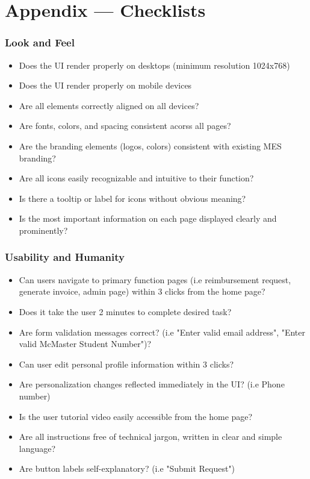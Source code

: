 \documentclass[12pt, titlepage]{article}
\begin{document}
\newpage{}
\section*{Appendix --- Checklists}


\hypertarget{checklist-nfr10}{}
\subsubsection{Look and Feel}

\begin{itemize}%
    \item Does the UI render properly on desktops (minimum resolution 1024x768) 
    \item Does the UI render properly on mobile devices 
    \item Are all elements correctly aligned on all devices? 
    \item Are fonts, colors, and spacing consistent acorss all pages?
    \item Are the branding elements (logos, colors) consistent with existing MES branding?
    \item Are all icons easily recognizable and intuitive to their function?
    \item Is there a tooltip or label for icons without obvious meaning?
    \item Is the most important information on each page displayed clearly and prominently?
\end{itemize}

\hypertarget{checklist-nfr11}{}
\subsubsection{Usability and Humanity}
  \begin{itemize} %
    \item Can users navigate to primary function pages (i.e reimbursement request, generate invoice, admin page) within 3 clicks from the home page?
    \item Does it take the user 2 minutes to complete desired task?
    \item Are form validation messages correct? (i.e "Enter valid email address", "Enter valid McMaster Student Number")?
    \item Can user edit personal profile information within 3 clicks?
    \item Are personalization changes reflected immediately in the UI? (i.e Phone number)
    \item Is the user tutorial video easily accessible from the home page?
    \item Are all instructions free of technical jargon, written in clear and simple language?
    \item Are button labels self-explanatory? (i.e "Submit Request")
  \end{itemize}
\end{document}
